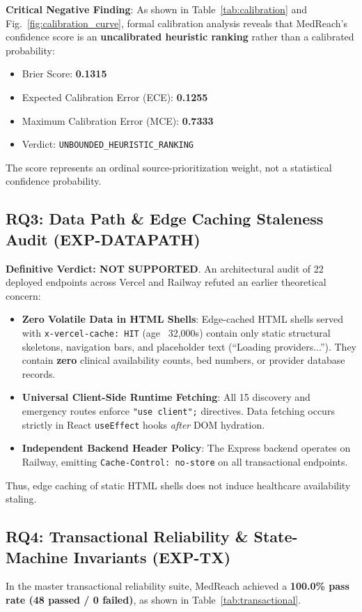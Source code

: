 \documentclass[conference]{IEEEtran}
\begin{document}
\textbf{Critical Negative Finding}: As shown in Table~\ref{tab:calibration} and Fig.~\ref{fig:calibration_curve}, formal calibration analysis reveals that MedReach's confidence score is an \textbf{uncalibrated heuristic ranking} rather than a calibrated probability:
\begin{itemize}
    \item Brier Score: \textbf{0.1315}
    \item Expected Calibration Error (ECE): \textbf{0.1255}
    \item Maximum Calibration Error (MCE): \textbf{0.7333}
    \item Verdict: \texttt{UNBOUNDED\_HEURISTIC\_RANKING}
\end{itemize}
The score represents an ordinal source-prioritization weight, not a statistical confidence probability.

\subsection{RQ3: Data Path \& Edge Caching Staleness Audit (EXP-DATAPATH)}
\textbf{Definitive Verdict: NOT SUPPORTED}.
An architectural audit of 22 deployed endpoints across Vercel and Railway refuted an earlier theoretical concern:
\begin{itemize}
    \item \textbf{Zero Volatile Data in HTML Shells}: Edge-cached HTML shells served with \texttt{x-vercel-cache: HIT} (age ~32,000s) contain only static structural skeletons, navigation bars, and placeholder text (``Loading providers...''). They contain \textbf{zero} clinical availability counts, bed numbers, or provider database records.
    \item \textbf{Universal Client-Side Runtime Fetching}: All 15 discovery and emergency routes enforce \texttt{"use client";} directives. Data fetching occurs strictly in React \texttt{useEffect} hooks \textit{after} DOM hydration.
    \item \textbf{Independent Backend Header Policy}: The Express backend operates on Railway, emitting \texttt{Cache-Control: no-store} on all transactional endpoints.
\end{itemize}
Thus, edge caching of static HTML shells does not induce healthcare availability staling.

\subsection{RQ4: Transactional Reliability \& State-Machine Invariants (EXP-TX)}
In the master transactional reliability suite, MedReach achieved a \textbf{100.0\% pass rate (48 passed / 0 failed)}, as shown in Table~\ref{tab:transactional}.
\end{document}
